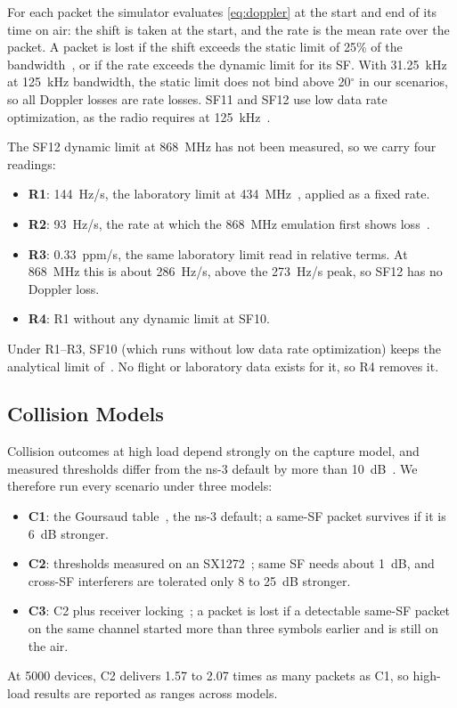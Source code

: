 \documentclass[journal]{IEEEtran}
\begin{document}
For each packet the simulator evaluates \eqref{eq:doppler} at the start and end of its time on air: the shift is taken at the start, and the rate is the mean rate over the packet. A packet is lost if the shift exceeds the static limit of 25\% of the bandwidth~\cite{asadullah2024,zadorozhny2022}, or if the rate exceeds the dynamic limit for its SF. With 31.25~kHz at 125~kHz bandwidth, the static limit does not bind above 20$^\circ$ in our scenarios, so all Doppler losses are rate losses. SF11 and SF12 use low data rate optimization, as the radio requires at 125~kHz~\cite{sx1276}.

The SF12 dynamic limit at 868~MHz has not been measured, so we carry four readings:
\begin{itemize}
\item \textbf{R1}: 144~Hz/s, the laboratory limit at 434~MHz~\cite{doroshkin2019}, applied as a fixed rate.
\item \textbf{R2}: 93~Hz/s, the rate at which the 868~MHz emulation first shows loss~\cite{colombo2022}.
\item \textbf{R3}: 0.33~ppm/s, the same laboratory limit read in relative terms. At 868~MHz this is about 286~Hz/s, above the 273~Hz/s peak, so SF12 has no Doppler loss.
\item \textbf{R4}: R1 without any dynamic limit at SF10.
\end{itemize}
Under R1--R3, SF10 (which runs without low data rate optimization) keeps the analytical limit of~\cite{asadullah2024}. No flight or laboratory data exists for it, so R4 removes it.

\subsection{Collision Models}
Collision outcomes at high load depend strongly on the capture model, and measured thresholds differ from the ns-3 default by more than 10~dB~\cite{croce2018}. We therefore run every scenario under three models:
\begin{itemize}
\item \textbf{C1}: the Goursaud table~\cite{goursaud2015}, the ns-3 default; a same-SF packet survives if it is 6~dB stronger.
\item \textbf{C2}: thresholds measured on an SX1272~\cite{croce2018}; same SF needs about 1~dB, and cross-SF interferers are tolerated only 8 to 25~dB stronger.
\item \textbf{C3}: C2 plus receiver locking~\cite{bor2016,rahmadhani2018}; a packet is lost if a detectable same-SF packet on the same channel started more than three symbols earlier and is still on the air.
\end{itemize}
At 5000 devices, C2 delivers 1.57 to 2.07 times as many packets as C1, so high-load results are reported as ranges across models.
\end{document}
